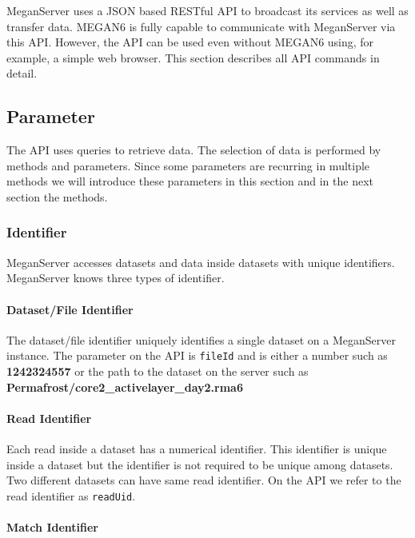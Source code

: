 \documentclass[11pt]{article}
\begin{document}
MeganServer uses a JSON based RESTful API to broadcast its services as well as transfer data. MEGAN6 is fully capable to communicate with MeganServer via this API. However, the API can be used even without MEGAN6 using, for example, a simple web browser. This section describes all API commands in detail.

\subsection{Parameter}

The API uses queries to retrieve data. The selection of data is performed by methods and parameters. Since some parameters are recurring in multiple methods we will introduce these parameters in this section and in the next section the methods.


\subsubsection{Identifier}

MeganServer accesses datasets and data inside datasets with unique identifiers. MeganServer knows three types of identifier.

\paragraph{Dataset/File Identifier}
\label{subsec:fileid}

The dataset/file identifier uniquely identifies a single dataset on a MeganServer instance. The parameter on the API is \texttt{fileId} and is either a number such as \textbf{1242324557} or the path to the dataset on the server such as \textbf{Permafrost/core2\_activelayer\_day2.rma6}

\paragraph{Read Identifier}
\label{subsec:readuid}

Each read inside a dataset has a numerical identifier. This identifier is unique inside a dataset but the identifier is not required to be unique among datasets. Two different datasets can have same read identifier. On the API we refer to the read identifier as \texttt{readUid}.

\paragraph{Match Identifier}
\label{subsec:matchuid}
\end{document}
